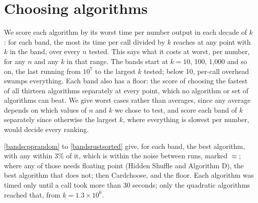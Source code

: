 \documentclass[letterpaper,11pt]{article}
\begin{document}
\section{Choosing algorithms}\label{choosing}

We score each algorithm by its worst time per number output in each
decade of \(k\): for each band, the most its time per call divided by
\(k\) reaches at any point with \(k\) in the band, over every \(n\)
tested. This says what it costs at worst, per number, for any \(n\)
and any \(k\) in that range. The bands start at \(k = 10\), 100,
1,000 and so on, the last running from \(10^7\) to the largest \(k\)
tested; below 10, per-call overhead swamps everything. Each band also
has a floor: the score of choosing the fastest of all thirteen
algorithms separately at every point, which no algorithm or set of
algorithms can beat. We give worst cases rather than averages, since
any average depends on which values of \(n\) and \(k\) we chose to
test, and score each band of \(k\) separately since otherwise the
largest \(k\), where everything is slowest per number, would decide
every ranking.

\autoref{bandscpprandom} to \autoref{bandsrustsorted} give, for each
band, the best algorithm, with any within 3\% of it, which is within
the noise between runs, marked \(\approx\); where any of those needs floating point
(Hidden Shuffle and Algorithm D), the best algorithm that does not;
then Cardchoose, and the floor. Each algorithm was timed only until a
call took more than 30 seconds; only the quadratic algorithms reached
that, from \(k = 1.3 \times 10^6\).

\begin{table}
    \small
    
    \caption{C++, random order: the best algorithms by worst time per
    number output in each band of \(k\)}\label{bandscpprandom}
\end{table}

\begin{table}
    \small
    
    \caption{C++, sorted order: the best algorithms by worst time per
    number output in each band of \(k\)}\label{bandscppsorted}
\end{table}

\begin{table}
    \small
    
    \caption{Rust, random order: the best algorithms by worst time per
    number output in each band of \(k\)}\label{bandsrustrandom}
\end{table}
\end{document}
